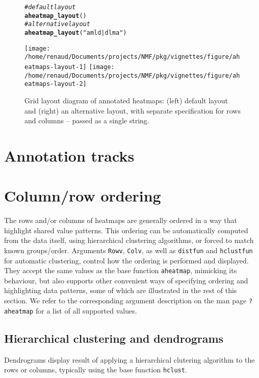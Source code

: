 \documentclass[a4paper]{article}\usepackage[]{graphicx}\usepackage[]{color}
\makeatletter
\newcommand{\hlstr}[1]{\textcolor[rgb]{0.192,0.494,0.8}{#1}}%
\newcommand{\hlcom}[1]{\textcolor[rgb]{0.678,0.584,0.686}{\textit{#1}}}%
\newcommand{\hlstd}[1]{\textcolor[rgb]{0.345,0.345,0.345}{#1}}%
\newcommand{\hlkwd}[1]{\textcolor[rgb]{0.737,0.353,0.396}{\textbf{#1}}}%
\newenvironment{kframe}{%
 \def\at@end@of@kframe{}%
 \ifinner\ifhmode%
  \def\at@end@of@kframe{\end{minipage}}%
  \begin{minipage}{\columnwidth}%
 \fi\fi%
 \def\FrameCommand##1{\hskip\@totalleftmargin \hskip-\fboxsep
 \colorbox{shadecolor}{##1}\hskip-\fboxsep
     \hskip-\linewidth \hskip-\@totalleftmargin \hskip\columnwidth}%
 \MakeFramed {\advance\hsize-\width
   \@totalleftmargin\z@ \linewidth\hsize
   \@setminipage}}%
 {\par\unskip\endMakeFramed%
 \at@end@of@kframe}
\newenvironment{knitrout}{}{} %
\let\code=\texttt
\makeatother
\begin{document}
\begin{figure}[!htpb]
\begin{knitrout}\small
{}\color{fgcolor}\begin{kframe}
\begin{alltt}
\hlcom{# default layout}
\hlkwd{aheatmap_layout}\hlstd{()}
\hlcom{# alternative layout}
\hlkwd{aheatmap_layout}\hlstd{(}\hlstr{"amld | dlma"}\hlstd{)}
\end{alltt}
\end{kframe}
\texttt{[image: /home/renaud/Documents/projects/NMF/pkg/vignettes/figure/aheatmaps-layout-1]} 
\texttt{[image: /home/renaud/Documents/projects/NMF/pkg/vignettes/figure/aheatmaps-layout-2]} 

\end{knitrout}
\caption{Grid layout diagram of annotated heatmaps: (left) default layout and
(right) an alternative layout, with separate specification for rows
and columns -- passed as a single string.}
\label{fig:layout}
\end{figure}

\section{Annotation tracks}

\section{Column/row ordering}

The rows and/or columns of heatmaps are generally ordered in a way that
highlight shared value patterns.
This ordering can be automatically computed from the data itself, using
hierarchical clustering algorithms, or forced to match known groups/order.
Arguments \code{Rowv}, \code{Colv}, as well as \code{distfun} and
\code{hclustfun} for automatic clustering, control how the ordering is
performed and displayed.
They accept the same values as the base function \code{aheatmap}, mimicking its
behaviour, but also supports other convenient ways of specifying ordering and
highlighting data patterns, some of which are illustrated in the rest of this
section.
We refer to the corresponding argument description on the man page
\code{?aheatmap} for a list of all supported values.

\subsection{Hierarchical clustering and dendrograms}
Dendrograms display result of applying a hierarchical clutering
algorithm to the rows or columns, typically using the base function \code{hclust}.
\end{document}
